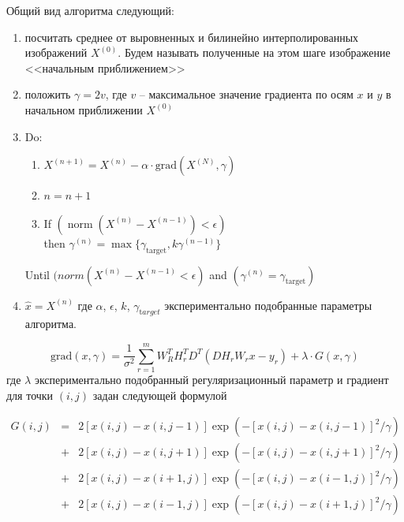 Общий вид алгоритма следующий:
\begin{enumerate}
  \item посчитать среднее от выровненных и билинейно интерполированных изображений $X^{(0)}$. Будем называть полученные на этом
    шаге изображение <<начальным приближением>>
  \item положить $\gamma = 2v$, где $v$ -- максимальное значение градиента по осям $x$ и $y$ в начальном приближении
    $X^{(0)}$
  \item Do:
    \begin{enumerate}
      \item $X^{(n+1)} = X^{(n)} - \alpha\cdot\mathrm{grad}(X^{(N)}, \gamma) $
      \item $n=n+1$
      \item If $(\operatorname{norm}(X^{(n)}-X^{(n-1)}) < \epsilon)$\\
        then $\gamma^{(n)} = \max \{\gamma_{\mathrm{target}}, k\gamma^{(n-1)}\}$
    \end{enumerate}
    Until $(norm(X^{(n)}-X^{(n-1)} < \epsilon)$ and $(\gamma^{(n)} = \gamma_{\mathrm{target}})$

  \item $ \hat{x} = X^{(n)}$
    где $\alpha$, $\epsilon$, $k$, $\gamma_{\mathrm target}$ экспериментально подобранные параметры алгоритма. 
\end{enumerate}
$$
\mathrm{grad}(x, \gamma) = \frac{1}{\sigma^2} \sum^m_{r=1} W^T_R H^T_r D^T (D H_r W_r x-y_r) + \lambda \cdot G(x, \gamma)
$$
где $\lambda$ экспериментально подобранный регуляризационный параметр и градиент для точки $(i,j)$ задан следующей формулой

$$
\begin{array}{rcl}
 G(i,j) & = & 2\left[x(i,j)-x(i,j-1)\right] \exp\left(-[ x(i,j)-x(i,j-1) ]^2/\gamma \right) \\
& + & 2\left[x(i,j)-x(i,j+1)\right] \exp\left(-[ x(i,j)-x(i,j+1) ]^2/\gamma \right) \\
& + & 2\left[x(i,j)-x(i+1,j)\right] \exp\left(-[ x(i,j)-x(i-1,j) ]^2/\gamma \right) \\
& + & 2\left[x(i,j)-x(i-1,j)\right] \exp\left(-[ x(i,j)-x(i+1,j) ]^2/\gamma \right)
\end{array}
$$


